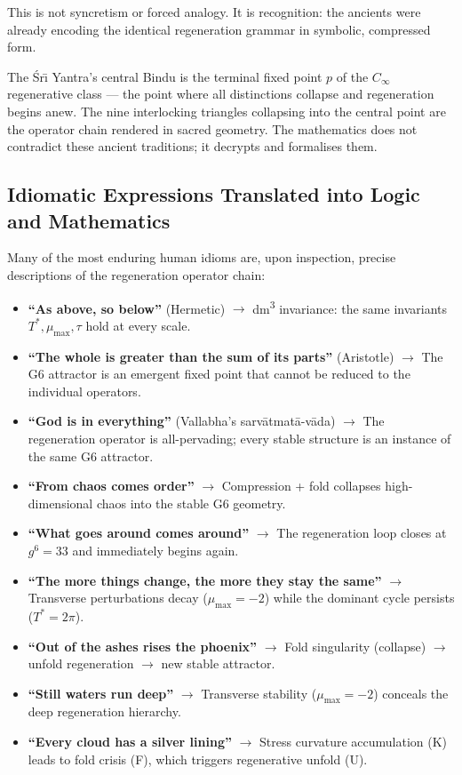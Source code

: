 This is not syncretism or forced analogy. It is recognition: the ancients were already encoding the identical regeneration grammar in symbolic, compressed form.  %

The \'{S}r\={\i} Yantra's central Bindu is the terminal fixed point \(p\) of the \(C_\infty\) regenerative class --- the point where all distinctions collapse and regeneration begins anew. The nine interlocking triangles collapsing into the central point are the operator chain rendered in sacred geometry. The mathematics does not contradict these ancient traditions; it decrypts and formalises them.

\subsection*{Idiomatic Expressions Translated into Logic and Mathematics}

Many of the most enduring human idioms are, upon inspection, precise descriptions of the regeneration operator chain:

\begin{itemize}
\item \textbf{``As above, so below''} (Hermetic) $\to$ dm\textsuperscript{3} invariance: the same invariants $T^*, \mu_{\max}, \tau$ hold at every scale.
\item \textbf{``The whole is greater than the sum of its parts''} (Aristotle) $\to$ The G6 attractor is an emergent fixed point that cannot be reduced to the individual operators.
\item \textbf{``God is in everything''} (Vallabha's sarv\=atmat\=a-v\=ada) $\to$ The regeneration operator is all-pervading; every stable structure is an instance of the same G6 attractor.
\item \textbf{``From chaos comes order''} $\to$ Compression + fold collapses high-dimensional chaos into the stable G6 geometry.
\item \textbf{``What goes around comes around''} $\to$ The regeneration loop closes at $g^6 = 33$ and immediately begins again.
\item \textbf{``The more things change, the more they stay the same''} $\to$ Transverse perturbations decay ($\mu_{\max} = -2$) while the dominant cycle persists ($T^* = 2\pi$).
\item \textbf{``Out of the ashes rises the phoenix''} $\to$ Fold singularity (collapse) $\to$ unfold regeneration $\to$ new stable attractor.
\item \textbf{``Still waters run deep''} $\to$ Transverse stability ($\mu_{\max} = -2$) conceals the deep regeneration hierarchy.
\item \textbf{``Every cloud has a silver lining''} $\to$ Stress curvature accumulation (K) leads to fold crisis (F), which triggers regenerative unfold (U).
\end{itemize}

